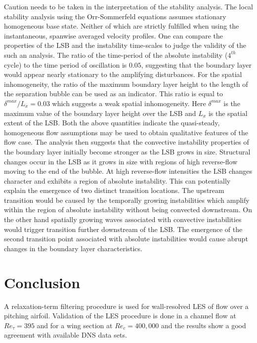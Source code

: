 Caution needs to be taken in the interpretation of the stability analysis. The local stability analysis using the Orr-Sommerfeld equations assumes stationary homogeneous base state. Neither of which are strictly fulfilled when using the instantaneous, spanwise averaged velocity profiles. One can compare the properties of the LSB and the instability time-scales to judge the validity of the such an analysis. The ratio of the time-period of the absolute instability ($4^{th}$ cycle) to the time period of oscillation is $0.05$, suggesting that the boundary layer would appear nearly stationary to the amplifying disturbances. For the spatial inhomogeneity, the ratio of the maximum boundary layer height to the length of the separation bubble can be used as an indicator. This ratio is equal to $\delta^{max}/L_{x}=0.03$ which suggests a weak spatial inhomogeneity. Here $\delta^{max}$ is the maximum value of the boundary layer height over the LSB and $L_{x}$ is the spatial extent of the LSB. Both the above quantities indicate the quasi-steady, homogeneous flow assumptions may be used to obtain qualitative features of the flow case. The analysis then suggests that the convective instability properties of the boundary layer initially become stronger as the LSB grows in size. Structural changes occur in the LSB as it grows in size with regions of high reverse-flow moving to the end of the bubble. At high reverse-flow intensities the LSB changes character and exhibits a region of absolute instability. This can potentially explain the emergence of two distinct transition locations. The upstream transition would be caused by the temporally growing instabilities which amplify within the region of absolute instability without being convected downstream. On the other hand spatially growing waves associated with convective instabilities would trigger transition further downstream of the LSB. The emergence of the second transition point associated with absolute instabilities would cause abrupt changes in the boundary layer characteristics.

\section{Conclusion}

A relaxation-term filtering procedure is used for wall-resolved LES of flow over a pitching airfoil. Validation of the LES procedure is done in a channel flow at $Re_{\tau}=395$ and for a wing section at $Re_{c}=400,000$ and the results show a good agreement with available DNS data sets.

